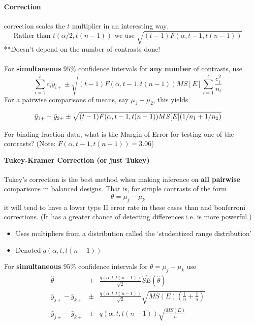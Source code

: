 \newpage

\textbf{\chef Correction}\\~\\
\chef correction scales the $t$ multiplier in an interesting way.
$$\mbox{Rather than }t(\alpha/2,t(n-1)) \mbox{ we use }\sqrt{(t-1)F(\alpha,t-1,t(n-1))}$$
**Doesn't depend on the number of contrasts done!\\~\\
For {\bf simultaneous} $95\%$ confidence intervals for {\bf any number} of contrasts, use
$$ \sum_{i=1}^{t} c_i \bar{y}_{i+} \pm \sqrt{(t-1) F(\alpha,t-1,t(n-1)) MS[E] \sum_{i=1}^{t} \frac{c_i^2}{n_i}}$$
For a pairwise comparisons of means, say $\mu_1-\mu_2$, this yields
\begin{large}
$$ \bar{y}_{1 +} - \bar{y}_{2 +}\pm \sqrt{(t-1) F(\alpha,t-1,t(n-1)) MS[E] (1/n_1 + 1/n_2)}$$
\end{large}
For binding fraction data, what is the Margin of Error for testing one of the contrasts? (Note: $F(\alpha,t-1,t(n-1))=3.06$)

\newpage

\textbf{Tukey-Kramer Correction (or just Tukey)}\\~\\
Tukey's correction is the best method when making inference on \textbf{all pairwise} comparisons in balanced designs. That is, for simple contrasts of the form
$$ \theta=\mu_j-\mu_k$$
it will tend to have a lower type II error rate in these cases than \chef and bonferroni corrections.  (It has a greater chance of detecting differences i.e. is more powerful.)
\begin{itemize}
\item Uses multipliers from a distribution called the `studentized range distribution'
\item Denoted $q(\alpha,t,t(n-1))$
\end{itemize}
For {\bf simultaneous} $95\%$ confidence intervals for $\theta=\mu_j-\mu_k$ use
\begin{eqnarray*}
\hat{\theta}&\pm& \frac{q(\alpha,t,t(n-1))}{\sqrt{2}} \hat{SE}(\hat{\theta})\\
\bar{y}_{j+}-\bar{y}_{k+}&\pm& \frac{q(\alpha,t,t(n-1))}{\sqrt{2}}\sqrt{MS(E)(\frac{1}{n}+\frac{1}{n})}\\
\bar{y}_{j+}-\bar{y}_{k+}&\pm& q(\alpha,t,t(n-1))\sqrt{\frac{MS(E)}{n}}
\end{eqnarray*}

\newpage

